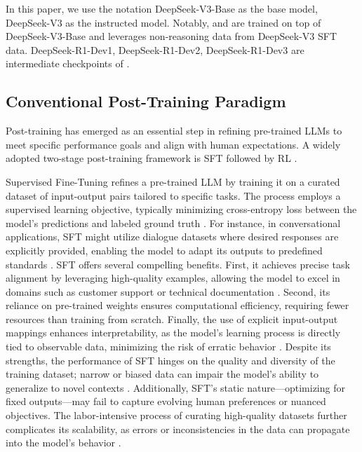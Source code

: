 In this paper, we use the notation DeepSeek-V3-Base as the base model, DeepSeek-V3 as the instructed model. Notably, \dsri{} and \dsro{} are trained on top of DeepSeek-V3-Base and  \dsri{} leverages non-reasoning data from DeepSeek-V3 SFT data. DeepSeek-R1-Dev1, DeepSeek-R1-Dev2, DeepSeek-R1-Dev3 are  intermediate checkpoints of \dsri{}. 


\subsection{Conventional Post-Training Paradigm}
Post-training has emerged as an essential step in refining pre-trained LLMs to meet specific performance goals and align with human expectations.  A widely adopted two-stage post-training framework is SFT  followed by RL \citep{ouyang2022training}. 

Supervised Fine-Tuning refines a pre-trained LLM by training it on a curated dataset of input-output pairs tailored to specific tasks. The process employs a supervised learning objective, typically minimizing cross-entropy loss between the model’s predictions and labeled ground truth \citep{gpt3}. For instance, in conversational applications, SFT might utilize dialogue datasets where desired responses are explicitly provided, enabling the model to adapt its outputs to predefined standards \citep{gpt2}. SFT offers several compelling benefits. First, it achieves precise task alignment by leveraging high-quality examples, allowing the model to excel in domains such as customer support or technical documentation \citep{gpt2}. Second, its reliance on pre-trained weights ensures computational efficiency, requiring fewer resources than training from scratch. Finally, the use of explicit input-output mappings enhances interpretability, as the model’s learning process is directly tied to observable data, minimizing the risk of erratic behavior  \citep{ouyang2022training}. Despite its strengths, the performance of SFT hinges on the quality and diversity of the training dataset; narrow or biased data can impair the model’s ability to generalize to novel contexts \citep{gpt3}. Additionally, SFT’s static nature—optimizing for fixed outputs—may fail to capture evolving human preferences or nuanced objectives. The labor-intensive process of curating high-quality datasets further complicates its scalability, as errors or inconsistencies in the data can propagate into the model’s behavior \citep{ouyang2022training}.

